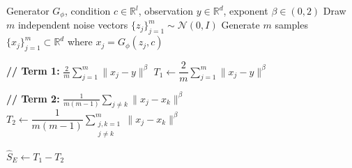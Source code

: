 




\begin{algorithm}[H]
\caption{Unbiased Energy Score Estimate $\hat{S}_E$}
\label{alg:energy_score}
\begin{algorithmic}[1]
\REQUIRE Generator $G_{\phi}$, condition $c \in \mathbb{R}^l$,
         observation $y \in \mathbb{R}^d$,
         exponent $\beta \in (0,2)$
\STATE Draw $m$ independent noise vectors $\{z_j\}_{j=1}^m \sim \mathcal{N}(0, I)$
\STATE Generate $m$ samples $\{x_j\}_{j=1}^m \subset \mathbb{R}^d$ where $x_j = G_{\phi}(z_j, c)$


\STATE \textbf{// Term 1: } $\frac{2}{m}\sum_{j=1}^{m}\|x_j - y\|^{\beta}$
\STATE $T_1 \leftarrow \dfrac{2}{m}\displaystyle\sum_{j=1}^{m}\|x_j - y\|^{\beta}$

\STATE \textbf{// Term 2: }
       $\frac{1}{m(m-1)}\sum_{j \neq k}\|x_j - x_k\|^{\beta}$
\STATE $T_2 \leftarrow \dfrac{1}{m(m-1)}\displaystyle\sum_{\substack{j,k=1 \\ j \neq k}}^{m}\|x_j - x_k\|^{\beta}$

\RETURN $\hat{S}_E \leftarrow T_1 - T_2$
\end{algorithmic}
\end{algorithm}

